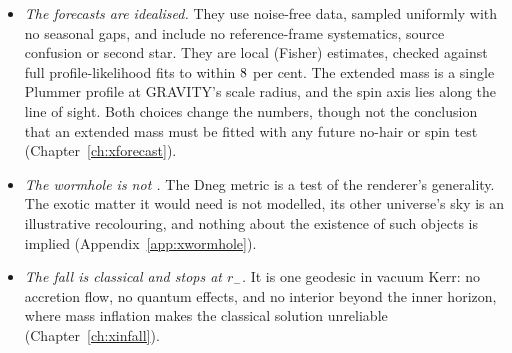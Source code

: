 \begin{itemize}
\item \emph{The forecasts are idealised.} They use noise-free data, sampled
uniformly with no seasonal gaps, and include no reference-frame systematics,
source confusion or second star. They are local (Fisher) estimates, checked
against full profile-likelihood fits to within $8$ per cent. The
extended mass is a single Plummer profile at GRAVITY's scale radius, and the
spin axis lies along the line of sight. Both choices change the numbers,
though not the conclusion that an extended mass must be fitted with any
future no-hair or spin test (Chapter~\ref{ch:xforecast}).
\item \emph{The wormhole is not \sgra.} The Dneg metric is a test of the
renderer's generality. The exotic matter it would need is not modelled, its
other universe's sky is an illustrative recolouring, and nothing about the
existence of such objects is implied (Appendix~\ref{app:xwormhole}).
\item \emph{The fall is classical and stops at $r_-$.} It is one geodesic in
vacuum Kerr: no accretion flow, no quantum effects, and no interior beyond
the inner horizon, where mass inflation makes the classical solution
unreliable (Chapter~\ref{ch:xinfall}).
\end{itemize}
